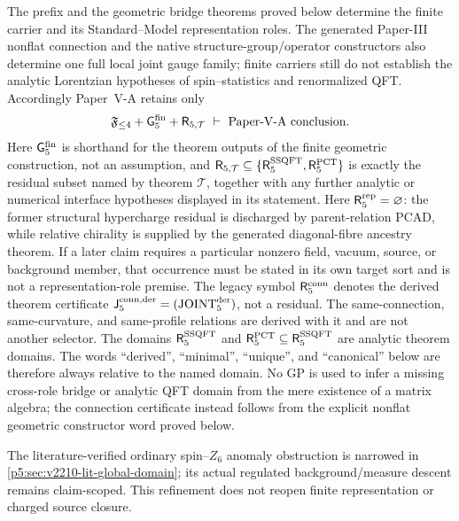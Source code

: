 \documentclass[12pt,a4paper]{article}
\begin{document}
The prefix and the geometric bridge theorems proved below determine the finite
carrier and its Standard--Model representation roles.  The generated
Paper-III nonflat connection and the native structure-group/operator
constructors also determine one full local joint gauge family; finite carriers
still do not establish the analytic Lorentzian hypotheses of spin--statistics
and renormalized QFT.  Accordingly Paper~V-A retains only
\begin{equation}
\label{p5:eq:theorem-scope-convention}
\mathfrak F_{\le4}+\mathsf G_5^{\rm fin}+\mathsf R_{5,\mathcal T}
\ \vdash\ \text{Paper-V-A conclusion}.
\end{equation}
Here \(\mathsf G_5^{\rm fin}\) is shorthand for the theorem outputs of the
finite geometric construction, not an assumption, and
\(\mathsf R_{5,\mathcal T}\subseteq
\{\mathsf R_5^{\rm SSQFT},\mathsf R_5^{\rm PCT}\}\) is exactly the residual
subset named by theorem \(\mathcal T\), together with any further analytic or
numerical interface hypotheses displayed in its statement.  Here
\(\mathsf R_5^{\rm rep}=\varnothing\): the former structural hypercharge
residual is discharged by parent-relation PCAD, while relative chirality is
supplied by the generated diagonal-fibre ancestry theorem.  If a later claim
requires a particular nonzero field, vacuum, source, or background member,
that occurrence must be stated in its own target sort and is not a
representation-role premise.  The legacy symbol
\(\mathsf R_5^{\rm conn}\) denotes the derived theorem certificate
\(\mathsf J_5^{\rm conn,der}=({\rm JOINT}_5^{\rm der})\), not a residual.
The same-connection, same-curvature, and same-profile relations are derived
with it and are not another selector.  The domains
\(\mathsf R_5^{\rm SSQFT}\) and
\(\mathsf R_5^{\rm PCT}\subseteq\mathsf R_5^{\rm SSQFT}\) are analytic theorem
domains.  The words ``derived'', ``minimal'', ``unique'', and ``canonical''
below are therefore always relative to the named domain.  No GP is used to
infer a missing cross-role bridge or analytic QFT domain from the mere
existence of a matrix algebra; the connection certificate instead follows
from the explicit nonflat geometric constructor word proved below.

The literature-verified ordinary spin--\(Z_6\) anomaly obstruction is
narrowed in \ref{p5:sec:v2210-lit-global-domain}; its actual regulated
background/measure descent remains claim-scoped.  This refinement does not
reopen finite representation or charged source closure.
\end{document}
